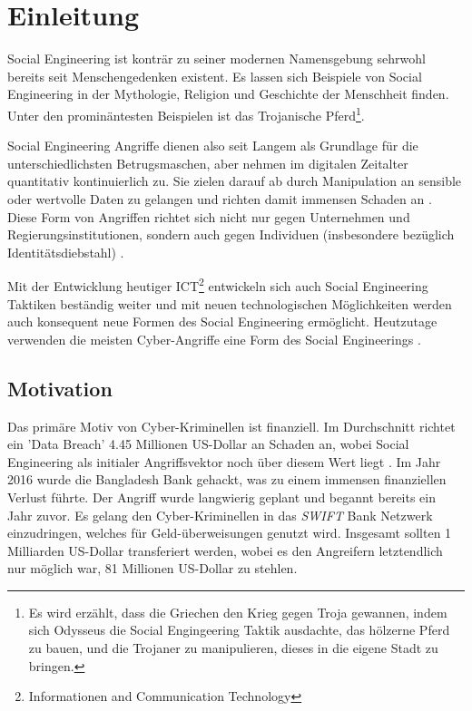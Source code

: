 \chapter{Einleitung}
\label{Einleitung}

Social Engineering ist konträr zu seiner modernen Namensgebung sehrwohl bereits seit
Menschengedenken existent. Es lassen sich Beispiele von Social Engineering in der Mythologie,
Religion und Geschichte der Menschheit finden.
Unter den prominäntest\-en Beispielen ist das Trojanische Pferd\footnote{Es wird erzählt, dass
die Griechen den Krieg gegen Troja gewannen,
indem sich Odysseus die Social Engingeering Taktik ausdachte, das hölzerne Pferd zu bauen,
und die Trojaner zu manipulieren, dieses in die eigene Stadt zu bringen.}.

Social Engineering Angriffe dienen also seit Langem als Grundlage für die unterschiedlichsten Betrugsmaschen,
aber nehmen im digitalen Zeitalter quantitativ kontinuierlich zu.
Sie zielen darauf ab durch Manipulation an sensible oder wertvolle Daten zu gelangen
und richten damit immensen Schaden an .
Diese Form von Angriffen richtet sich nicht nur gegen Unternehmen und Regierungsinstitutionen,
sondern auch gegen Individuen (insbesondere bezüglich Identitätsdiebstahl) .

Mit der Entwicklung heutiger ICT\footnote{Informationen and Communication Technology} entwickeln sich auch
Social Engineering Taktiken beständig weiter und mit neuen technologischen Möglichkeiten werden auch
konsequent neue Formen des Social Engineering ermöglicht. Heutzutage verwenden die meisten
Cyber-Angriffe eine Form des Social Engineerings .

\section{Motivation}

Das primäre Motiv von Cyber-Kriminellen ist finanziell. Im Durchschnitt richtet ein 'Data Breach'
4.45 Millionen US-Dollar an Schaden an, wobei Social Engineering als initialer Angriffsvektor noch
über diesem Wert liegt .
Im Jahr 2016 wurde die Bangladesh Bank gehackt, was zu einem immensen finanziellen Verlust führte.
Der Angriff wurde langwierig geplant und begannt bereits ein Jahr zuvor.
Es gelang den Cyber-Kriminellen in das \textit{SWIFT} Bank Netzwerk einzudringen, welches für Geld-überweisungen
genutzt wird. Insgesamt sollten 1 Milliarden US-Dollar transferiert werden, wobei es den Angreifern
letztendlich nur möglich war, 81 Millionen US-Dollar zu stehlen.

